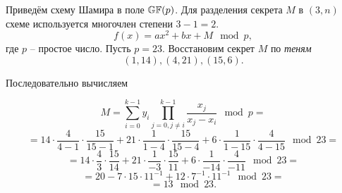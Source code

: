 \example
Приведём схему Шамира в поле $\mathbb{GF}(p)$. Для разделения секрета $M$ в $(3,n)$ схеме используется многочлен степени $3-1=2$.
    \[ f(x) = a x^2 + b x + M \mod p, \]
где $p$ -- простое число. Пусть $p=23$. Восстановим секрет $M$ по \emph{теням}
    \[ (1,14), (4,21), (15,6). \]

Последовательно вычисляем

    \[ M = \sum\limits_{i=0}^{k-1} y_i \prod\limits_{j=0, j \neq i}^{k-1} \frac{x_j}{x_j - x_i} \mod p = \]
    \[= 14 \cdot \frac{4}{4-1} \cdot \frac{15}{15-1} + 21 \cdot \frac{1}{1-4} \cdot \frac{15}{15-4} + 6 \cdot \frac{1}{1-15} \cdot \frac{4}{4-15} \mod 23 = \]
    \[ =14 \cdot \frac{4}{3} \cdot \frac{15}{14} + 21 \cdot \frac{1}{-3} \cdot \frac{15}{11} + 6 \cdot \frac{1}{-14} \cdot \frac{4}{-11} \mod 23 = \]
    \[= 20 - 7 \cdot 15 \cdot 11^{-1} + 12 \cdot 7^{-1} \cdot 11^{-1} \mod 23 = \]
    \[ = 13 \mod 23.\]
\exampleend
